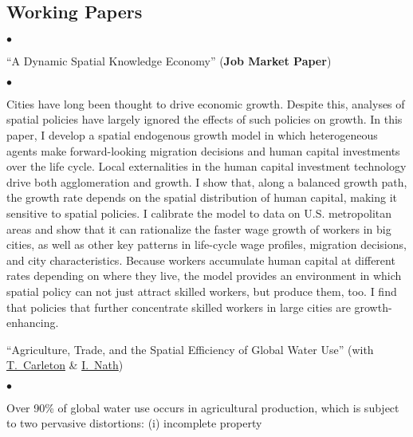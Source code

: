 \documentclass[margin,line]{res}
\newenvironment{list0}{
  \begin{list}{$\bullet$}{%
      \setlength{\itemsep}{0in}
      \setlength{\parsep}{0in} \setlength{\parskip}{0in}
      \setlength{\topsep}{0in} \setlength{\partopsep}{0in}
      \setlength{\leftmargin}{0.0in}}}{\end{list}}
\newenvironment{list1}{
  \begin{list}{$\bullet$}{%
      \setlength{\itemsep}{0in}
      \setlength{\parsep}{0in} \setlength{\parskip}{0in}
      \setlength{\topsep}{0in} \setlength{\partopsep}{0in}
      \setlength{\leftmargin}{0.17in}}}{\end{list}}
\begin{document}
\begin{resume}
\section{\sc Working Papers}
\begin{list0}
    \item[] ``A Dynamic Spatial Knowledge Economy'' (\textbf{Job Market Paper})
    \vspace*{2mm}
    \begin{list1}
        \item[] %
        \noindent
        Cities have long been thought to drive economic growth. Despite this, analyses
        of spatial policies have largely ignored the effects of such policies on growth.
        In this paper, I develop a spatial endogenous growth model in which
        heterogeneous agents make forward-looking migration decisions and
        human capital investments over the life cycle.
        Local externalities in the human capital investment technology
        drive both agglomeration and growth.
        I show that, along a balanced growth path, the growth rate depends on the spatial
        distribution of human capital, making it sensitive to spatial policies.
        I calibrate the model to data on U.S. metropolitan areas
        and show that it can rationalize the faster wage growth of workers in big cities,
        as well as other key patterns in life-cycle wage profiles, migration decisions,
        and city characteristics.
        Because workers accumulate human capital at different rates depending
        on where they live, the model provides an environment in which spatial policy
        can not just attract skilled workers, but produce them, too.
        I find that policies that further concentrate skilled workers in large cities
        are growth-enhancing.
    \end{list1}
    \vspace*{2mm}
    \item[]
    \item[]
    \item[] ``Agriculture, Trade, and the Spatial Efficiency of Global Water Use''
    (with \href{https://www.tammacarleton.com/}{T.~Carleton}
    \& \href{https://www.ishannath.com/}{I.~Nath})
    \vspace{-2mm}
    \begin{list1}
        \item[] Over 90\% of global water use occurs in agricultural production,
        which is subject to two pervasive distortions: (i) incomplete property

\end{list1}
\end{list0}
\end{resume}
\end{document}
